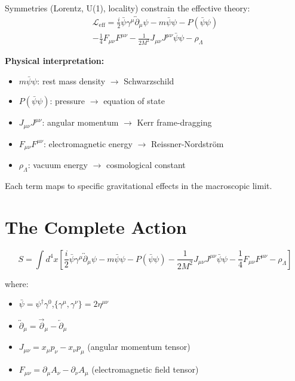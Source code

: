 \documentclass[11pt,a4paper]{article}
\theoremstyle{definition}
\theoremstyle{remark}
\begin{document}
	Symmetries (Lorentz, U(1), locality) constrain the effective theory:
	\begin{multline}
		\mathcal{L}_{\mathrm{eff}} = \frac{i}{2}\bar{\psi}\gamma^\mu\overleftrightarrow{\partial}_\mu\psi - m\bar{\psi}\psi - P(\bar{\psi}\psi) \\
		- \frac{1}{4}F_{\mu\nu}F^{\mu\nu} - \frac{1}{2M^2}J_{\mu\nu}J^{\mu\nu}\bar{\psi}\psi - \rho_\Lambda
		\label{eq:eff_lagrangian}
	\end{multline}
	
	\textbf{Physical interpretation:}
	\begin{itemize}
		\item $m\bar{\psi}\psi$: rest mass density $\to$ Schwarzschild
		\item $P(\bar{\psi}\psi)$: pressure $\to$ equation of state
		\item $J_{\mu\nu}J^{\mu\nu}$: angular momentum $\to$ Kerr frame-dragging
		\item $F_{\mu\nu}F^{\mu\nu}$: electromagnetic energy $\to$ Reissner-Nordstr\"om
		\item $\rho_\Lambda$: vacuum energy $\to$ cosmological constant
	\end{itemize}
	Each term maps to specific gravitational effects in the macroscopic limit.
	
	\section{The Complete Action}
	
	\begin{equation}
		\boxed{
			S = \int d^4x \left[\frac{i}{2}\bar{\psi}\gamma^\mu\overleftrightarrow{\partial}_\mu\psi - m\bar{\psi}\psi - P(\bar{\psi}\psi) - \frac{1}{2M^2}J_{\mu\nu}J^{\mu\nu}\bar{\psi}\psi - \frac{1}{4}F_{\mu\nu}F^{\mu\nu} - \rho_\Lambda\right]
		}
		\label{eq:complete_action}
	\end{equation}
	
	where:
	\begin{itemize}
		\item $\bar{\psi}=\psi^\dagger\gamma^0$,\quad $\{\gamma^\mu,\gamma^\nu\}=2\eta^{\mu\nu}$
		\item $\overleftrightarrow{\partial}_\mu = \overrightarrow{\partial}_\mu - \overleftarrow{\partial}_\mu$
		\item $J_{\mu\nu} = x_\mu p_\nu - x_\nu p_\mu$ (angular momentum tensor)
		\item $F_{\mu\nu} = \partial_\mu A_\nu - \partial_\nu A_\mu$ (electromagnetic field tensor)
	\end{itemize}
	
\end{document}
